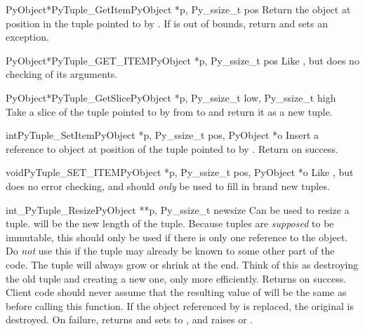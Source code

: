 \begin{cfuncdesc}{PyObject*}{PyTuple_GetItem}{PyObject *p, Py_ssize_t pos}
  Return the object at position  in the tuple pointed to by
  .  If  is out of bounds, return \NULL{} and sets an
   exception.
\end{cfuncdesc}

\begin{cfuncdesc}{PyObject*}{PyTuple_GET_ITEM}{PyObject *p, Py_ssize_t pos}
  Like , but does no checking of its
  arguments.
\end{cfuncdesc}

\begin{cfuncdesc}{PyObject*}{PyTuple_GetSlice}{PyObject *p,
                                               Py_ssize_t low, Py_ssize_t high}
  Take a slice of the tuple pointed to by  from  to
   and return it as a new tuple.
\end{cfuncdesc}

\begin{cfuncdesc}{int}{PyTuple_SetItem}{PyObject *p,
                                        Py_ssize_t pos, PyObject *o}
  Insert a reference to object  at position  of the
  tuple pointed to by . Return  on success.
\end{cfuncdesc}

\begin{cfuncdesc}{void}{PyTuple_SET_ITEM}{PyObject *p,
                                          Py_ssize_t pos, PyObject *o}
  Like , but does no error checking, and
  should \emph{only} be used to fill in brand new tuples.  
\end{cfuncdesc}

\begin{cfuncdesc}{int}{_PyTuple_Resize}{PyObject **p, Py_ssize_t newsize}
  Can be used to resize a tuple.   will be the new length
  of the tuple.  Because tuples are \emph{supposed} to be immutable,
  this should only be used if there is only one reference to the
  object.  Do \emph{not} use this if the tuple may already be known to
  some other part of the code.  The tuple will always grow or shrink
  at the end.  Think of this as destroying the old tuple and creating
  a new one, only more efficiently.  Returns  on success.
  Client code should never assume that the resulting value of
   will be the same as before calling this function.
  If the object referenced by  is replaced, the
  original  is destroyed.  On failure, returns
   and sets  to \NULL{}, and raises
   or
  .
\end{cfuncdesc}


